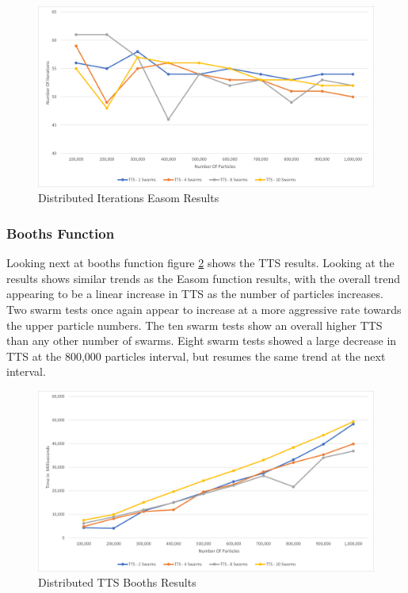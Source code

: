 \documentclass[oneside,12pt]{book}
\begin{document}
\begin{figure}[H]
    \centering
    \includegraphics[scale=0.45]{Images/Graphs/DistributedEasomEpoch.png}
    \caption{Distributed Iterations Easom Results}
    \label{fig:Distributed_Epoc_Easom_Results}
\end{figure}

\subsubsection{Booths Function}
Looking next at booths function figure \ref{fig:Distributed_TTS_Booths_Results} shows the TTS results. Looking at the results shows similar trends as the Easom function results, with the overall trend appearing to be a linear increase in TTS as the number of particles increases. Two swarm tests once again appear to increase at a more aggressive rate towards the upper particle numbers. The ten swarm tests show an overall higher TTS than any other number of swarms. Eight swarm tests showed a large decrease in TTS at the 800,000 particles interval, but resumes the same trend at the next interval. 

\begin{figure}[H]
    \centering
    \includegraphics[scale=0.45]{Images/Graphs/DistributedBoothsTTS.png}
    \caption{Distributed TTS Booths Results}
    \label{fig:Distributed_TTS_Booths_Results}
\end{figure}
\end{document}
